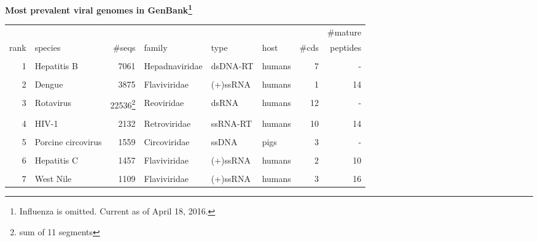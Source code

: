 \documentclass[landscape]{slides}
\begin{document}
\begin{slide}
\begin{center}

\textbf{Most prevalent viral genomes in GenBank\footnote{Influenza is omitted. Current as of April 18, 2016.}}

\tiny
\begin{tabular}{r|l|r|l|l|l|r|r}
       &                    &              &                &          &        &       & \#mature \\ 
  rank & species            &       \#seqs & family         & type     & host   & \#cds & peptides \\ \hline
       &                    &              &                &          &        &       &          \\ 
     1 & Hepatitis B        &         7061 & Hepadnaviridae & dsDNA-RT & humans &     7 &       -  \\
       &                    &              &                &          &        &       &          \\ 
     2 & Dengue             &         3875 & Flaviviridae   & (+)ssRNA & humans &     1 &      14  \\
       &                    &              &                &          &        &       &          \\ 
     3 & Rotavirus          &      22536\footnote{sum of 11 segments}  & Reoviridae     & dsRNA    & humans &    12 &       -  \\
       &                    &              &                &          &        &       &          \\ 
     4 & HIV-1              &        2132  & Retroviridae   & ssRNA-RT & humans &    10 &      14  \\
       &                    &              &                &          &        &       &          \\ 
     5 & Porcine circovirus &        1559  & Circoviridae   & ssDNA    & pigs   &     3 &       -  \\
       &                    &              &                &          &        &       &          \\ 
     6 & Hepatitis C        &        1457  & Flaviviridae   & (+)ssRNA & humans &     2 &      10  \\
       &                    &              &                &          &        &       &          \\ 
     7 & West Nile          &        1109  & Flaviviridae   & (+)ssRNA & humans &     3 &      16  \\

\end{tabular}
\end{center}
\end{slide}
\end{document}
